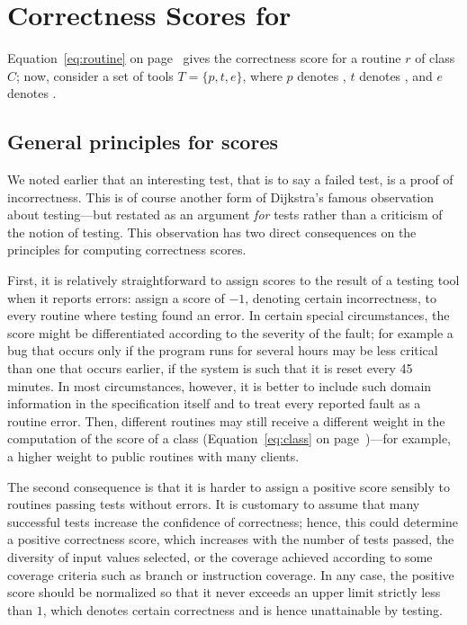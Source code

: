 \section{Correctness Scores for \EVE}\label{sec:va:scores}

Equation~\ref{eq:routine} on page~\pageref{eq:routine} gives the correctness score for a routine $r$ of class $C$; now, consider a set of tools $T =\{p, t, e\}$, where $p$ denotes \AutoProof, $t$ denotes \AutoTest, and $e$ denotes \Inspector.



\subsection{General principles for scores}

We noted earlier that an interesting test, that is to say a failed test, is a proof of incorrectness. This is of course another form of Dijkstra's famous observation about testing---but restated as an argument \emph{for} tests rather than a criticism of the notion of testing. 
This observation has two direct consequences on the principles for computing correctness scores.

First, it is relatively straightforward to assign scores to the result of a testing tool when it reports errors: assign a score of $-1$, denoting certain incorrectness, to every routine where testing found an error.
In certain special circumstances, the score might be differentiated according to the severity of the fault; for example a bug that occurs only if the program runs for several hours may be less critical than one that occurs earlier, if the system is such that it is reset every 45 minutes.
In most circumstances, however, it is better to include such domain information in the specification itself and to treat every reported fault as a routine error.
Then, different routines may still receive a different weight in the computation of the score of a class (Equation~\ref{eq:class} on page~\pageref{eq:class})---for example, a higher weight to public routines with many clients.

The second consequence is that it is harder to assign a positive score sensibly to routines passing tests without errors.
It is customary to assume that many successful tests increase the confidence of correctness; hence, this could determine a positive correctness score, which increases with the number of tests passed, the diversity of input values selected, or the coverage achieved according to some coverage
criteria such as branch or instruction coverage.
In any case, the positive score should be normalized so that it never exceeds an upper limit strictly less than $1$, which denotes certain correctness
and is hence unattainable by testing.

